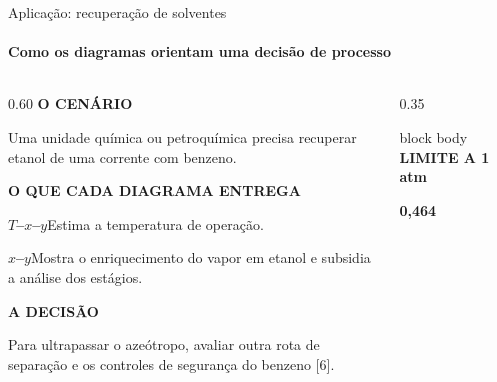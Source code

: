 \documentclass[aspectratio=169,11pt]{beamer}
\begin{document}
\begin{frame}[t]{Aplicação: recuperação de solventes}
  \framesubtitle{Como os diagramas orientam uma decisão de processo}
  \vspace{0.12cm}
  \begin{columns}[T,onlytextwidth]
    \begin{column}{0.60\textwidth}
      {\color{PrismTeal}\small\bfseries O CENÁRIO}\par\vspace{0.13cm}
      {\fontsize{12}{15}\selectfont Uma unidade química ou petroquímica precisa recuperar etanol de uma
        corrente com benzeno.\par}
      \vspace{0.24cm}
      {\color{PrismTeal}\small\bfseries O QUE CADA DIAGRAMA ENTREGA}\par\vspace{0.12cm}
      {\fontsize{10.5}{14}\selectfont
        \textbf{$T$--$x$--$y$}\quad Estima a temperatura de operação.\par\vspace{0.16cm}
        \textbf{$x$--$y$}\quad Mostra o enriquecimento do vapor em etanol e subsidia a análise dos
          estágios.\par}
      \vspace{0.24cm}
      {\color{PrismTeal}\small\bfseries A DECISÃO}\par\vspace{0.12cm}
      {\fontsize{10.5}{14}\selectfont Para ultrapassar o azeótropo, avaliar outra rota de separação e os
        controles de segurança do benzeno [6].\par}
    \end{column}
    \begin{column}{0.35\textwidth}
      \begin{beamercolorbox}[wd=\linewidth,sep=0.30cm]{block body}
        {\color{PrismTeal}\fontsize{9}{12}\selectfont\bfseries LIMITE A 1 atm}\par
        \vspace{0.26cm}
        {\color{PrismNavy}\fontsize{29}{32}\selectfont\bfseries 0,464}\par
        \vspace{0.10cm}

\end{beamercolorbox}
\end{column}
\end{columns}
\end{frame}
\end{document}

